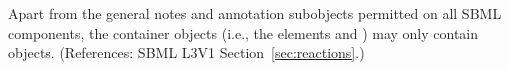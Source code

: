 Apart from the general notes and annotation subobjects permitted on all
SBML components, the \ListOfSpeciesReferences container objects (i.e., the
\Reaction elements  and ) may
only contain \SpeciesReference objects.  (References: SBML L3V1
Section~\ref{sec:reactions}.)
